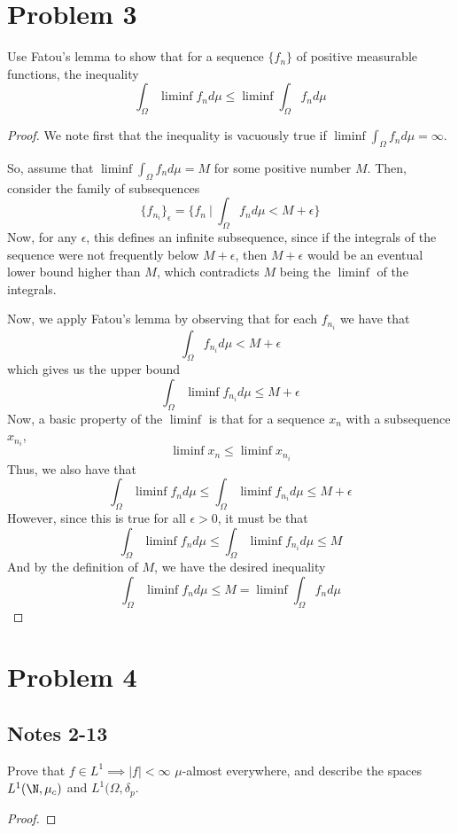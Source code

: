 \documentclass[fontsize=11pt]{scrartcl} %
\numberwithin{equation}{section} %
\numberwithin{figure}{section} %
\numberwithin{table}{section} %
\begin{document}
\section*{Problem 3}
Use Fatou's lemma to show that for a sequence $\{f_n\}$ of positive measurable functions,
the inequality
\[
\int_{\Omega}\liminf f_nd\mu \leq \liminf\int_{\Omega} f_nd\mu
\]

\begin{proof}
We note first that the inequality is vacuously true if $\liminf\int_{\Omega}f_nd\mu = \infty$.

So, assume that $\liminf\int_{\Omega}f_nd\mu = M$ for some positive number $M$. Then,
consider the family of subsequences
\[
\{f_{n_i}\}_{\epsilon} = \{f_n\ |\ \int_{\Omega} f_nd\mu < M+\epsilon\}
\]
Now, for any $\epsilon$, this defines an infinite subsequence, since if the integrals of
the sequence were not frequently below $M+\epsilon$, then $M+\epsilon$ would be an
eventual lower bound higher than $M$, which contradicts $M$ being the $\liminf$ of the
integrals.

Now, we apply Fatou's lemma by observing that for each $f_{n_i}$ we have that
\[
\int_{\Omega} f_{n_i}d\mu < M+\epsilon
\]
which gives us the upper bound
\[
\int_{\Omega}\liminf f_{n_i}d\mu \leq M+\epsilon
\]
Now, a basic property of the $\liminf$ is that for a sequence $x_n$ with a subsequence
$x_{n_i}$,
\[
\liminf x_n \leq \liminf x_{n_i}
\]
Thus, we also have that
\[
\int_{\Omega} \liminf f_nd\mu \leq \int_{\Omega}\liminf f_{n_i} d\mu\leq M+\epsilon
\]
However, since this is true for all $\epsilon > 0$, it must be that
\[
\int_{\Omega} \liminf f_nd\mu \leq \int_{\Omega}\liminf f_{n_i} d\mu\leq M
\]
And by the definition of $M$, we have the desired inequality
\[
\int_{\Omega} \liminf f_nd\mu \leq M = \liminf\int_{\Omega}f_nd\mu
\]

\end{proof}

\pagebreak
\section*{Problem 4}
\subsection*{Notes 2-13}
Prove that $f\in L^1\implies |f|<\infty$ $\mu$-almost everywhere, and describe the 
spaces $L^1(\N,\mu_c)$ and $L^1(\Omega,\delta_p$.
\\
\begin{proof}

\end{proof}
\end{document}
